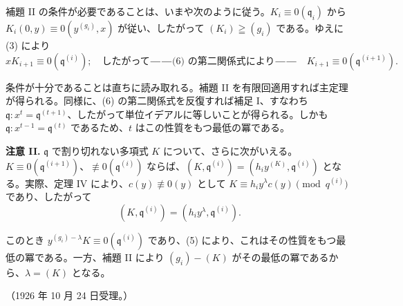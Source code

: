 補題 II の条件が必要であることは、いまや次のように従う。\(K_i\equiv0(\mathfrak{q}_i)\) から \(K_i(0,y)\equiv0(y^{(g_i)},x)\) が従い、したがって \((K_i)\geqq(g_i)\) である。ゆえに (3) により
\[
xK_{i+1}\equiv0(\mathfrak{q}^{(i)});\quad
\text{したがって――(6) の第二関係式により――}\quad
K_{i+1}\equiv0(\mathfrak{q}^{(i+1)}).
\]

条件が十分であることは直ちに読み取れる。補題 II を有限回適用すれば主定理が得られる。同様に、(6) の第二関係式を反復すれば補足 I、すなわち \(\mathfrak{q}:x^t=\mathfrak{q}^{(t+1)}\)、したがって単位イデアルに等しいことが得られる。しかも \(\mathfrak{q}:x^{t-1}=\mathfrak{q}^{(t)}\) であるため、\(t\) はこの性質をもつ最低の冪である。

\textbf{注意 II.} \(\mathfrak{q}\) で割り切れない多項式 \(K\) について、さらに次がいえる。\(K\equiv0(\mathfrak{q}^{(i+1)})\)、\(\not\equiv0(\mathfrak{q}^{(i)})\) ならば、\((K,\mathfrak{q}^{(i)})=(h_iy^{(K)},\mathfrak{q}^{(i)})\) となる。実際、定理 IV により、\(c(y)\not\equiv0(y)\) として \(K\equiv h_iy^\lambda c(y)\pmod {q^{(i)}}\) であり、したがって
\[
(K,\mathfrak{q}^{(i)})=(h_iy^\lambda,\mathfrak{q}^{(i)}).
\]

このとき \(y^{(g_i)-\lambda}K\equiv0(\mathfrak{q}^{(i)})\) であり、(5) により、これはその性質をもつ最低の冪である。一方、補題 II により \((g_i)-(K)\) がその最低の冪であるから、\(\lambda=(K)\) となる。

\begin{center}
（1926 年 10 月 24 日受理。）
\end{center}
